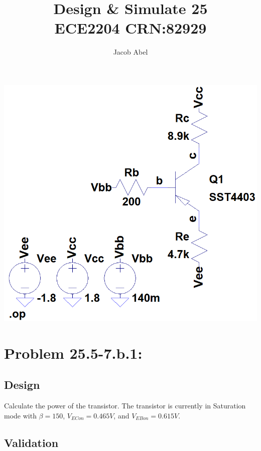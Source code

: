 \documentclass[12pt,letterpaper,titlepage]{article}
\author{Jacob Abel}
\title{	Design \& Simulate 25
	\\\large ECE2204 CRN:82929
}
\begin{document}
\maketitle
\begin{raggedright}
\begin{paracol}{2}
\switchcolumn
\begin{center}
\includegraphics[width=\textwidth, height=12\baselineskip, keepaspectratio=true]{ds2}
\end{center}
\switchcolumn

\section{Problem 25.5-7.b.1: } 
\subsection{Design}
Calculate the power of the transistor. The transistor is currently in Saturation mode with $\beta = 150$, $V_{ECon} = 0.465V$, and $V_{EBon} = 0.615V$.

\end{paracol}
\clearpage
\subsection{Validation}


\end{raggedright}
\end{document}
